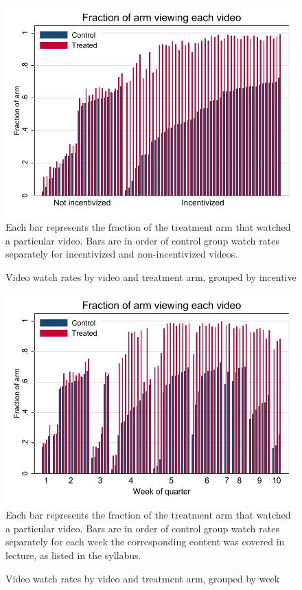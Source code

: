 \documentclass[12pt]{article}
\begin{document}
\clearpage
\begin{figure}[t]
\begin{center}
\caption{Video watch rates by video and treatment arm, grouped by incentive}
\label{video_cdf}
\includegraphics[width=1\textwidth, angle=0]{../plots/bar_uviews}
\footnotesize Each bar represents the fraction of the treatment arm that watched a particular video.
Bars are in order of control group watch rates separately for incentivized and non-incentivized videos.
\end{center}
\end{figure}

\clearpage
\begin{figure}[t]
\begin{center}
\caption{Video watch rates by video and treatment arm, grouped by week}
\label{video_cdf_week}
\includegraphics[width=1\textwidth, angle=0]{../plots/bar_uviews_week}
\footnotesize Each bar represents the fraction of the treatment arm that watched a particular video.
Bars are in order of control group watch rates separately for each week the corresponding content was covered in lecture, as listed in the syllabus.
\end{center}
\end{figure}
\end{document}
